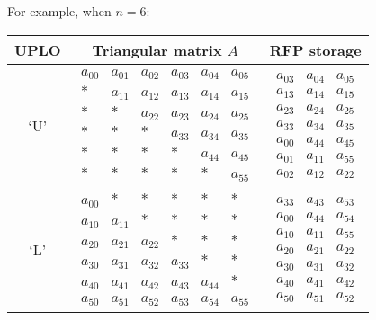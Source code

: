 For example, when $n = 6$:
\begin{center}
\begin{tabular}{|c|c|c|} \hline
UPLO & Triangular matrix $A$ & RFP storage \\ \hline
`U' &
$
\begin{array}{cccccc}
  a_{00} & a_{01} & a_{02} & a_{03} & a_{04} & a_{05} \\
   \ast     & a_{11} & a_{12} & a_{13} & a_{14} & a_{15} \\   
   \ast     & \ast      & a_{22} & a_{23} & a_{24} & a_{25} \\      
   \ast     & \ast      & \ast      & a_{33} & a_{34} & a_{35} \\      
   \ast     & \ast      & \ast      & \ast      & a_{44} & a_{45} \\      
   \ast     & \ast      & \ast      & \ast      & \ast      & a_{55}
\end{array}
$
&
$
\begin{array}{ccc}
a_{03} & a_{04} & a_{05} \\
a_{13} & a_{14} & a_{15} \\
a_{23} & a_{24} & a_{25} \\
a_{33} & a_{34} & a_{35} \\
a_{00} & a_{44} & a_{45} \\
a_{01} & a_{11} & a_{55} \\
a_{02} & a_{12} & a_{22}
\end{array} 
$
\\ \hline
`L' &
$
\begin{array}{cccccc}     
  a_{00} & \ast      & \ast      & \ast      & \ast      & \ast \\
  a_{10} & a_{11} & \ast      & \ast      & \ast      & \ast \\
  a_{20} & a_{21} & a_{22} & \ast      & \ast      & \ast \\
  a_{30} & a_{31} & a_{32} & a_{33} & \ast      & \ast \\
  a_{40} & a_{41} & a_{42} & a_{43} & a_{44} & \ast \\
  a_{50} & a_{51} & a_{52} & a_{53} & a_{54} & a_{55}
\end{array}
$ 
&
$
\begin{array}{ccc}
  a_{33} & a_{43} & a_{53} \\
  a_{00} & a_{44} & a_{54} \\ 
  a_{10} & a_{11} & a_{55} \\
  a_{20} & a_{21} & a_{22} \\
  a_{30} & a_{31} & a_{32} \\
  a_{40} & a_{41} & a_{42} \\
  a_{50} & a_{51} & a_{52}
\end{array}
$
\\ \hline
\end{tabular}
\end{center}

